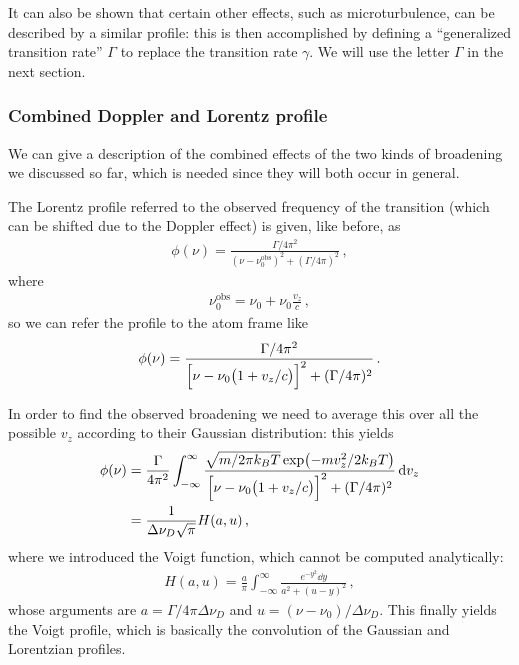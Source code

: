 \documentclass[main.tex]{subfiles}
\begin{document}
It can also be shown that certain other effects, such as microturbulence, can be described by a similar profile: this is then accomplished by defining a ``generalized transition rate'' \(\Gamma \) to replace the transition rate \(\gamma \). 
We will use the letter \(\Gamma \) in the next section. 

\subsubsection{Combined Doppler and Lorentz profile}

We can give a description of the combined effects of the two kinds of broadening we discussed so far, which is needed since they will both occur in general. 

The Lorentz profile referred to the observed frequency of the transition (which can be shifted due to the Doppler effect) is given, like before, as 
%
\begin{align}
\phi (\nu ) = \frac{\Gamma / 4 \pi^2}{(\nu - \nu_0^{\text{obs}} )^2 + (\Gamma / 4 \pi )^2}
\,,
\end{align}
%
where 
%
\begin{align}
\nu_0^{\text{obs}} = \nu_0 + \nu_0 \frac{v_z}{c}
\,,
\end{align}
%
so we can refer the profile to the atom frame like 
%
\begin{align}
\phi (\nu ) = \frac{\Gamma / 4 \pi^2}{\qty[\nu - \nu_0 \qty(1 + v_z / c)]^2 + (\Gamma / 4 \pi )^2}
\,.
\end{align}

In order to find the observed broadening we need to average this over all the possible \(v_z\) according to their Gaussian distribution: this yields 
%
\begin{align}
\phi (\nu ) &= \frac{\Gamma }{4 \pi^2}
\int_{- \infty }^{\infty } \frac{\sqrt{m / 2 \pi k_B T}\exp(- m v_z^2 / 2 k_B T)}{\qty[\nu - \nu_0 \qty(1 + v_z/c)]^2 + (\Gamma / 4 \pi )^2} \dd{v_z}  \\
&= \frac{1}{\Delta \nu_D \sqrt{\pi }} H(a, u)
\,,
\end{align}
%
where we introduced the Voigt function, which cannot be computed analytically:
%
\begin{align}
H(a, u) = \frac{a}{\pi }  \int_{- \infty }^{\infty } \frac{e^{- y^2} \dd{y}}{a^2 + (u-y)^2}
\,,
\end{align}
%
whose arguments are \(a = \Gamma / 4 \pi \Delta \nu _D\) and \(u = (\nu - \nu_0 ) / \Delta \nu _D\). 
This finally yields the Voigt profile, which is basically the convolution of the Gaussian and Lorentzian profiles. 
\end{document}
